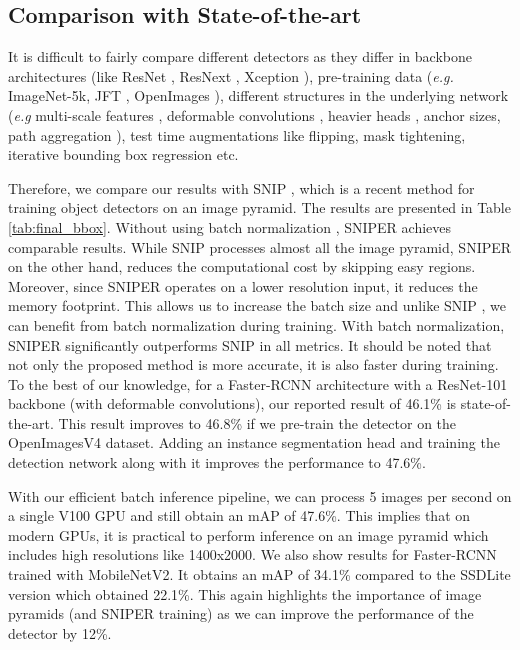 \documentclass{article}
\begin{document}
\subsection{Comparison with State-of-the-art}
It is difficult to fairly compare different detectors as they differ in backbone architectures (like ResNet \cite{he2016deep}, ResNext \cite{xie2017aggregated}, Xception \cite{chollet2016xception}), pre-training data (\textit{e.g.} ImageNet-5k, JFT \cite{hinton2015distilling}, OpenImages \cite{openimages}), different structures in the underlying network (\textit{e.g} multi-scale features \cite{lin2017feature,najibi2017ssh}, deformable convolutions \cite{dai2017deformable}, heavier heads \cite{peng2017megdet}, anchor sizes, path aggregation \cite{liu2018path}), test time augmentations like flipping, mask tightening, iterative bounding box regression etc. 

Therefore, we compare our results with SNIP \cite{singh2017analysis}, which is a recent method for training object detectors on an image pyramid. The results are presented in Table \ref{tab:final_bbox}. Without using batch normalization \cite{ioffe2015batch}, SNIPER achieves comparable results. While SNIP \cite{singh2017analysis} processes almost all the image pyramid, SNIPER on the other hand, reduces the computational cost by skipping easy regions. Moreover, since SNIPER operates on a lower resolution input, it reduces the memory footprint. This allows us to increase the batch size and unlike SNIP \cite{singh2017analysis}, we can benefit from batch normalization during training. With batch normalization, SNIPER significantly outperforms SNIP in all metrics. It should be noted that not only the proposed method is more accurate, it is also  faster during training. To the best of our knowledge, for a Faster-RCNN architecture with a ResNet-101 backbone (with deformable convolutions), our reported result of 46.1\% is state-of-the-art. This result improves to 46.8\% if we pre-train the detector on the OpenImagesV4 dataset. Adding an instance segmentation head and training the detection network along with it improves the performance to 47.6\%.


With our efficient batch inference pipeline, we can process 5 images per second on a single V100 GPU and still obtain an mAP of 47.6\%. This implies that on modern GPUs, it is practical to perform inference on an image pyramid which includes high resolutions like 1400x2000. We also show results for Faster-RCNN trained with MobileNetV2. It obtains an mAP of 34.1\% compared to the SSDLite \cite{mobilenetv2} version which obtained 22.1\%. This again highlights the importance of image pyramids (and SNIPER training) as we can improve the performance of the detector by 12\%. 
\end{document}
